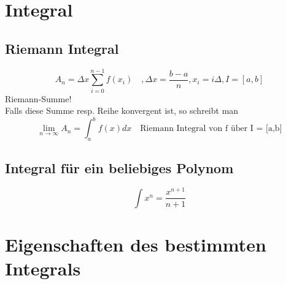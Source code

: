 



















\section{Integral}
\subsection{Riemann Integral}
\[ \boxed{A_n = \Delta x \sum_{i=0}^{n-1} f(x_i) \quad 
, \Delta x = \frac{b - a}{n} , x_i = i \Delta , I = [a,b]} \]
Riemann-Summe! \\
Falls diese Summe resp. Reihe konvergent ist, so schreibt man
\[ \boxed{\lim_{n \rightarrow \infty} A_n = \int_{a}^{b} f(x) d x \quad \text{Riemann Integral von f über I = [a,b]} } \]

\subsection{Integral für ein beliebiges Polynom}
\[ \boxed{\int x^n = \frac{x^{n + 1}}{n + 1}} \]

\section{Eigenschaften des bestimmten Integrals}

